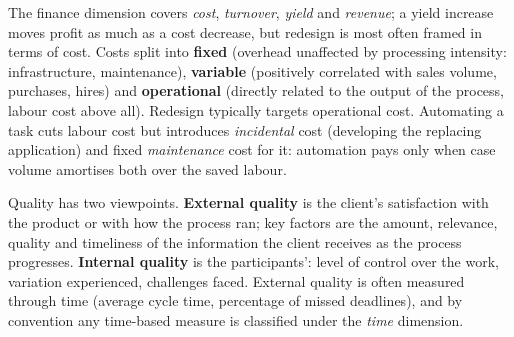 The finance dimension covers \emph{cost}, \emph{turnover}, \emph{yield} and \emph{revenue}; a yield increase moves profit as much as a cost decrease, but redesign is most often framed in terms of cost. Costs split into \textbf{fixed} (overhead unaffected by processing intensity: infrastructure, maintenance), \textbf{variable} (positively correlated with sales volume, purchases, hires) and \textbf{operational} (directly related to the output of the process, labour cost above all). Redesign typically targets operational cost. Automating a task cuts labour cost but introduces \emph{incidental} cost (developing the replacing application) and fixed \emph{maintenance} cost for it: automation pays only when case volume amortises both over the saved labour.

Quality has two viewpoints. \textbf{External quality} is the client's satisfaction with the product or with how the process ran; key factors are the amount, relevance, quality and timeliness of the information the client receives as the process progresses. \textbf{Internal quality} is the participants': level of control over the work, variation experienced, challenges faced. External quality is often measured through time (average cycle time, percentage of missed deadlines), and by convention any time-based measure is classified under the \emph{time} dimension.

